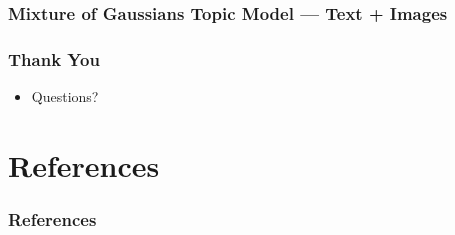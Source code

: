 \documentclass{beamer}
\begin{document}
\begin{frame}
  \frametitle{Mixture of Gaussians Topic Model --- Text + Images}
\end{frame}

\begin{frame}
  \frametitle{Thank You}
  \begin{itemize}
  \item Questions?
  \end{itemize}
\end{frame}

\section{References}
\begin{frame}[t,allowframebreaks]{}
\frametitle{References}
{\small
\printbibliography
\par}
\end{frame}
\end{document}
